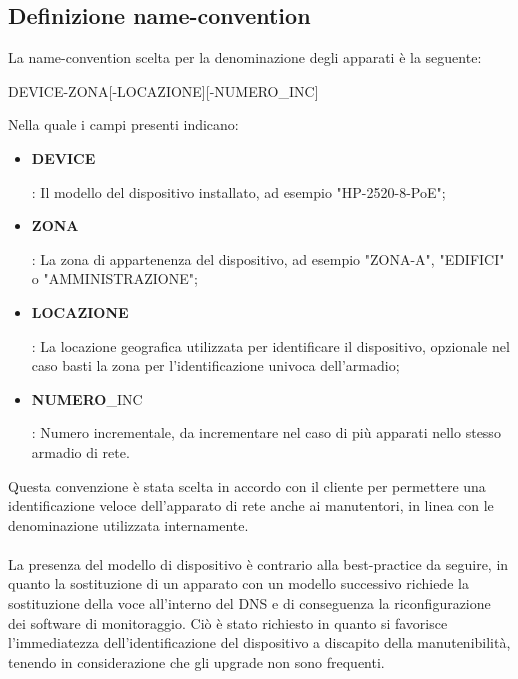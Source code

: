 \documentclass[Tesi.tex]{subfiles}
\begin{document}
\subsection{Definizione name-convention}
La name-convention scelta per la denominazione degli apparati è la seguente:\\
{ \centering
\begin{ttfamily}
	\large DEVICE-ZONA[-LOCAZIONE][-NUMERO\_INC]\\
\end{ttfamily}
}
\medskip
Nella quale i campi presenti indicano: 
\begin{itemize}
	\item  \begin{ttfamily}\textbf{DEVICE}\end{ttfamily}: Il modello del dispositivo installato, ad esempio "HP-2520-8-PoE";
	\item  \begin{ttfamily}\textbf{ZONA}\end{ttfamily}: La zona di appartenenza del dispositivo, ad esempio "ZONA-A", "EDIFICI" o "AMMINISTRAZIONE";
	\item  \begin{ttfamily}\textbf{LOCAZIONE}\end{ttfamily}: La locazione geografica utilizzata per identificare il dispositivo, opzionale nel caso basti la zona per l'identificazione univoca dell'armadio;
	\item  \begin{ttfamily}\textbf{NUMERO}\_INC\end{ttfamily}: Numero incrementale, da incrementare nel caso di più apparati nello stesso armadio di rete.
\end{itemize}

Questa convenzione è stata scelta in accordo con il cliente per permettere una identificazione veloce dell'apparato di rete anche ai manutentori, in linea con le denominazione utilizzata internamente. \\\\
La presenza del modello di dispositivo è contrario alla best-practice da seguire, in quanto la sostituzione di un apparato con un modello successivo richiede la sostituzione della voce all'interno del DNS e di conseguenza la riconfigurazione dei software di monitoraggio. Ciò è stato richiesto in quanto si favorisce l'immediatezza dell'identificazione del dispositivo a discapito della manutenibilità, tenendo in considerazione che gli upgrade non sono frequenti. \\
\end{document}
